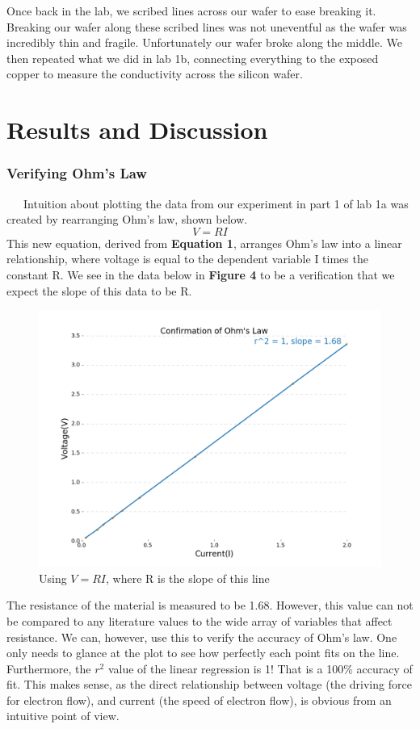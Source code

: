 \documentclass[11pt]{article}
\begin{document}
Once back in the lab, we scribed lines across our wafer to ease breaking it. Breaking our wafer along these scribed lines was not uneventful as the wafer was incredibly thin and fragile. Unfortunately our wafer broke along the middle. We then repeated what we did in lab 1b, connecting everything to the exposed copper to measure the conductivity across the silicon wafer.

\section*{Results and Discussion}
\subsubsection*{Verifying Ohm's Law}
\ \ \ Intuition about plotting the data from our experiment in part 1 of lab 1a was created by rearranging Ohm's law, shown below.
\begin{equation}
V = RI
\end{equation}
This new equation, derived from \textbf{Equation 1}, arranges Ohm's law into a linear relationship, where voltage is equal to the dependent variable I times the constant R. We see in the data below in \textbf{Figure 4} to be a verification that we expect the slope of this data to be R.

\begin{figure}[h]
	\centering
	\includegraphics[scale=0.35]{ohmslaw.png}
	\caption{Using $V = RI$, where R is the slope of this line}
\end{figure}

The resistance of the material is measured to be 1.68. However, this value can not be compared to any literature values to the wide array of variables that affect resistance. We can, however, use this to verify the accuracy of Ohm's law. One only needs to glance at the plot to see how perfectly each point fits on the line. Furthermore, the $r^2$ value of the linear regression is 1! That is a 100\% accuracy of fit. This makes sense, as the direct relationship between voltage (the driving force for electron flow), and current (the speed of electron flow), is obvious from an intuitive point of view.
\end{document}
